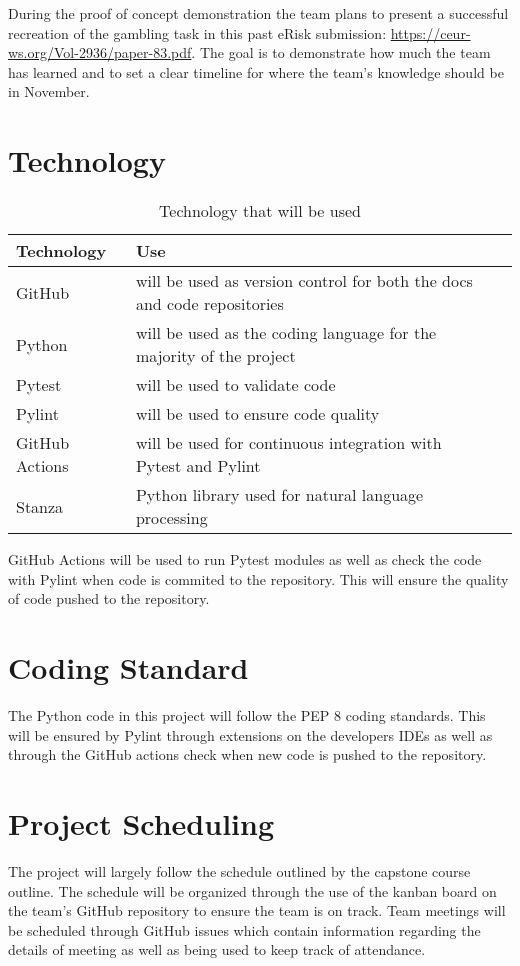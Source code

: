 \documentclass{article}
\begin{document}
During the proof of concept demonstration the team plans to present a successful recreation of the gambling task in this past eRisk submission: \url{https://ceur-ws.org/Vol-2936/paper-83.pdf}. The goal is to demonstrate how much the team has learned and to set a clear timeline for where the team's knowledge should be in November.

\section{Technology}

\begin{table}[hp]
	\caption{Technology that will be used} \label{TblTechnology}
	\begin{tabularx}{\textwidth}{llX}
	\toprule
	\textbf{Technology} & \textbf{Use}\\
	\midrule
	GitHub & will be used as version control for both the docs and code repositories\\
	Python & will be used as the coding language for the majority of the project\\
	Pytest & will be used to validate code\\
	Pylint & will be used to ensure code quality\\
	GitHub Actions & will be used for continuous integration with Pytest and Pylint\\
	Stanza & Python library used for natural language processing\\
	\bottomrule
	\end{tabularx}
\end{table}

GitHub Actions will be used to run Pytest modules as well as check the code with Pylint when code is commited to the repository.
This will ensure the quality of code pushed to the repository.

\section{Coding Standard}

The Python code in this project will follow the PEP 8 coding standards.
This will be ensured by Pylint through extensions on the developers IDEs
as well as through the GitHub actions check when new code is pushed to the repository.

\section{Project Scheduling}

The project will largely follow the schedule outlined by the capstone course outline.
The schedule will be organized through the use of the kanban board on the team's GitHub
repository to ensure the team is on track. Team meetings will be scheduled through GitHub issues
which contain information regarding the details of meeting as well as being used to
keep track of attendance.
\end{document}
